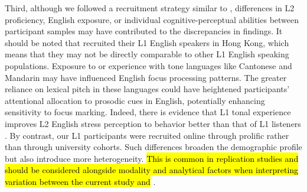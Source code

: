 Third, although we followed a recruitment strategy similar to \textcite{ge2021a}, differences in L2 proficiency, English exposure, or individual cognitive-perceptual abilities between participant samples may have contributed to the discrepancies in findings. It should be noted that \textcite{ge2021a} recruited their L1 English speakers in Hong Kong, which means that they may not be directly comparable to other L1 English speaking populations. Exposure to or experience with tone languages like Cantonese and Mandarin may have influenced English focus processing patterns. The greater reliance on lexical pitch in these languages could have heightened participants’ attentional allocation to prosodic cues in English, potentially enhancing sensitivity to focus marking. Indeed, there is evidence that L1 tonal experience improves L2 English stress perception to behavior better than that of L1 listeners \parencite{choi2019better, choi2021cantonese}. By contrast, our L1 participants were recruited online through prolific rather than through university cohorts. Such differences broaden the demographic profile but also 
introduce more heterogeneity. \hl{This is common in replication studies and should be considered alongside modality and analytical factors when interpreting variation between the current study and }\textcite{ge2021a}.



